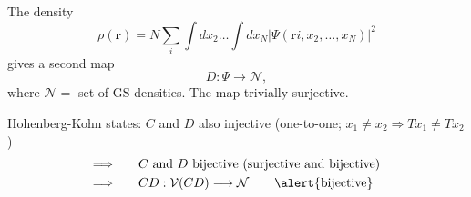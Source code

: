 \documentclass[compress]{beamer}
\begin{document}
\frame
{
  \frametitle{}
\begin{small}
{\scriptsize
The density 
\begin{equation}
  \rho(\mathbf{r})=N\sum_{i}\int dx_{2}\dots \int dx_{N}\vert \Psi(\mathbf{r}i,x_{2},\dots ,x_{N})\vert^{2} \nonumber
\end{equation}
gives a second map 
\begin{equation}
  D:\Psi \longrightarrow \mathcal{N}, \nonumber
\end{equation}
where $\mathcal{N} =$ set of GS densities. The map trivially surjective.

\vspace{1cm}
\begin{lemma}
Hohenberg-Kohn states: $C$ and $D$ also \alert{injective} (one-to-one; $x_{1}\neq x_{2} \Rightarrow Tx_{1}\neq Tx_{2}$)
\begin{align}
\Longrightarrow \qquad & C \text{ and } D \text{ bijective (surjective and bijective)} \nonumber \\
\Longrightarrow \qquad & CD:\mathcal{V}(CD)\longrightarrow \mathcal{N} \qquad \text{\alert{bijective}} \nonumber
\end{align}
\end{lemma} 

}
\end{small}}
\end{document}
